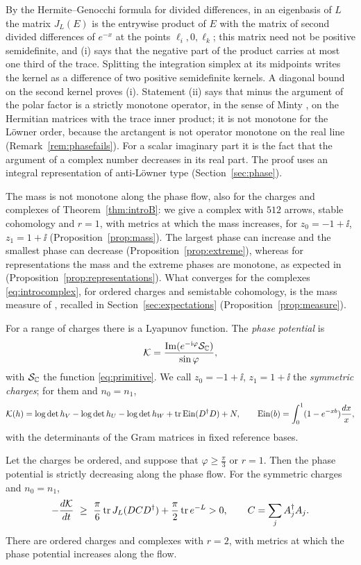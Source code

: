 By the Hermite--Genocchi formula for divided differences, in an eigenbasis
of $L$ the matrix
$J_L(E)$ is the entrywise product of $E$ with the matrix of second divided
differences of $e^{-x}$ at the points $\ell_i,0,\ell_k$; this matrix need not be
positive semidefinite, and (i) says that the negative part of the product
carries at most one third of the trace. Splitting the integration simplex
at its midpoints writes the kernel as a difference of two positive
semidefinite kernels. A diagonal bound on the second kernel proves (i).
Statement (ii)
says that minus the argument of the polar factor is a strictly monotone
operator, in the sense of Minty \cite{min62}, on the Hermitian matrices with
the trace inner product; it is not monotone for the L\"owner order, because
the
arctangent is not operator monotone on the real line
(Remark~\ref{rem:phasefails}). For a scalar imaginary part it is the fact
that the argument of a complex number decreases in its real part. The proof
uses an integral representation of anti-L\"owner type \cite{aud11}
(Section~\ref{sec:phase}).

The mass is not monotone along the phase flow, also for the charges and
complexes of Theorem~\ref{thm:introB}: we give a complex with $512$ arrows,
stable cohomology and $r=1$, with metrics at which the mass increases, for
$z_0=-1+\ii$, $z_1=1+\ii$ (Proposition~\ref{prop:mass}). The largest phase
can increase and the smallest phase can decrease
(Proposition~\ref{prop:extreme}), whereas for representations the mass and
the extreme phases are monotone, as expected in \cite[\S4.1]{hkkp26}
(Proposition~\ref{prop:representations}). What converges for the complexes
\eqref{eq:introcomplex}, for ordered charges and semistable cohomology, is
the mass measure of \cite[\S4.2]{hkkp26}, recalled in
Section~\ref{sec:expectations} (Proposition~\ref{prop:measure}).

For a range of charges there is a Lyapunov function. The \emph{phase
potential} is
\[
 \mathcal K=\frac{\operatorname{Im}(e^{-\mathrm i\varphi}\mathcal S_{\mathbb C})}{\sin\varphi},
\]
with $\mathcal S_{\mathbb C}$ the function \eqref{eq:primitive}. We call
$z_0=-1+\ii$, $z_1=1+\ii$ the \emph{symmetric charges}; for them and
$n_0=n_1$,
\[
 \mathcal K(h)=\log\det h_V-\log\det h_U-\log\det h_W+\operatorname{tr}\operatorname{Ein}(D^\dagger D)+N,
 \qquad\operatorname{Ein}(b)=\int_0^1(1-e^{-xb})\frac{dx}x ,
\]
with the determinants of the Gram matrices in fixed reference bases.

\begin{theorem}\label{thm:introE}
Let the charges be ordered, and suppose that $\varphi\geq\frac\pi3$ or
$r=1$. Then the phase potential is strictly decreasing along the phase flow.
For the symmetric charges and $n_0=n_1$,
\[
 -\frac{d\mathcal K}{dt}\ \geq\ \frac\pi6\operatorname{tr} J_L(DCD^\dagger)+\frac\pi2\operatorname{tr} e^{-L}>0,
 \qquad C=\sum_jA_j^\dagger A_j .
\]
There are ordered charges and complexes with $r=2$, with metrics at which
the phase potential increases along the flow.
\end{theorem}


